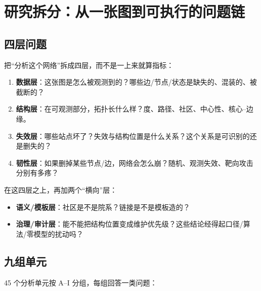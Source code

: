 \section{研究拆分：从一张图到可执行的问题链}

\subsection{四层问题}

把“分析这个网络”拆成四层，而不是一上来就算指标：

\begin{enumerate}
  \item \textbf{数据层}：这张图是怎么被观测到的？哪些边/节点/状态是缺失的、混装的、被截断的？
  \item \textbf{结构层}：在可观测部分，拓扑长什么样？度、路径、社区、中心性、核心--边缘。
  \item \textbf{失效层}：哪些站点坏了？失效与结构位置是什么关系？这个关系是可识别的还是删失的？
  \item \textbf{韧性层}：如果删掉某些节点/边，网络会怎么崩？随机、观测失效、靶向攻击分别有多疼？
\end{enumerate}

在这四层之上，再加两个“横向”层：

\begin{itemize}
  \item \textbf{语义/模板层}：社区是不是院系？链接是不是模板造的？
  \item \textbf{治理/审计层}：能不能把结构位置变成维护优先级？这些结论经得起口径/算法/零模型的扰动吗？
\end{itemize}

\subsection{九组单元}

45 个分析单元按 A--I 分组，每组回答一类问题：

